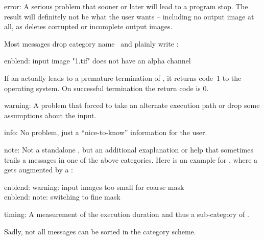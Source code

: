 \begin{codelist}
\item[error:] A serious problem that sooner or later will lead to a
  program stop.  The result will definitely not be what the user wants
  -- including no output image at all, as \appcmd{} deletes corrupted
  or incomplete output images.

  Most messages drop category name~ and plainly write
  :

  \begin{literal}
    enblend: input image "1.tif" does not have an alpha channel
  \end{literal}

  If an  actually leads to a premature termination of
  \appcmd, it returns code~1 to the operating
  system.  On successful termination the return code is 0.

\item[warning:] A problem that forced \appcmd{} to take an alternate
  execution path or drop some assumptions about the input.

\item[info:] No problem, just a ``nice-to-know'' information for the
  user.

\item[note:] Not a standalone , but an additional
  exaplanation or help that sometimes trails a messages in one of the
  above categories.  Here is an example for \appcmd{}, where a
   gets augmented by a :

  \begin{literal}
    enblend: warning: input images too small for coarse mask \\
    enblend: note: switching to fine mask
  \end{literal}

\item[timing:] A measurement of the execution duration and thus a
  sub\hyp{}category of .
\end{codelist}

\noindent Sadly, not all messages can be sorted in the category
scheme.

